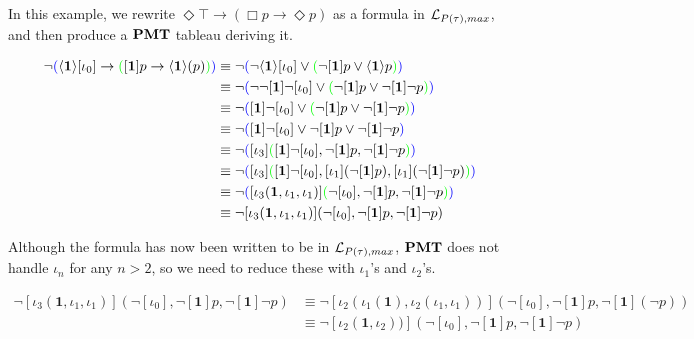 \begin{example}
    In this example, we rewrite $\Diamond\top \to (\Box p \to \Diamond p)$ as a formula in $\mathcal{L}_{P(\tau),max}$, and then produce a $\textbf{PMT}$ tableau deriving it. 

    \begin{align*}
        \neg\textcolor{blue}{(}\langle\textbf{1}\rangle[\iota_0] \rightarrow \textcolor{green}{(}[\textbf{1}] p \rightarrow \langle\textbf{1}\rangle (p)\textcolor{green}{)}\textcolor{blue}{)}
        &\equiv \neg\textcolor{blue}{(}\neg\langle\textbf{1}\rangle[\iota_0] \vee \textcolor{green}{(}\neg[\textbf{1}] p \vee \langle\textbf{1}\rangle p\textcolor{green}{)}\textcolor{blue}{)}\\
        &\equiv \neg\textcolor{blue}{(}\neg\neg[\textbf{1}]\neg[\iota_0] \vee \textcolor{green}{(}\neg[\textbf{1}] p \vee \neg[\textbf{1}]\neg p\textcolor{green}{)}\textcolor{blue}{)}\\
        &\equiv \neg\textcolor{blue}{(}[\textbf{1}]\neg[\iota_0] \vee \textcolor{green}{(}\neg[\textbf{1}] p \vee \neg[\textbf{1}]\neg p\textcolor{green}{)}\textcolor{blue}{)}\\
        &\equiv \neg\textcolor{blue}{(}[\textbf{1}]\neg[\iota_0] \vee\neg[\textbf{1}] p \vee \neg[\textbf{1}]\neg p\textcolor{blue}{)}\\
        &\equiv \neg\textcolor{blue}{(}[\iota_3]\textcolor{green}{(}[\textbf{1}]\neg[\iota_0] ,\neg[\textbf{1}] p , \neg[\textbf{1}]\neg p\textcolor{green}{)}\textcolor{blue}{)}\\
        &\equiv \neg\textcolor{blue}{(}[\iota_3]\textcolor{green}{(}[\textbf{1}]\neg[\iota_0] ,[\iota_1](\neg[\textbf{1}] p) , [\iota_1](\neg[\textbf{1}]\neg p)\textcolor{green}{)}\textcolor{blue}{)}\\
        &\equiv \neg\textcolor{blue}{(}[\iota_3(\textbf{1},\iota_1,\iota_1)]\textcolor{green}{(}\neg[\iota_0],\neg[\textbf{1}] p , \neg[\textbf{1}]\neg p\textcolor{green}{)}\textcolor{blue}{)}\\
        &\equiv \neg[\iota_3(\textbf{1},\iota_1,\iota_1)](\neg[\iota_0],\neg[\textbf{1}] p , \neg[\textbf{1}]\neg p)
    \end{align*}

    \par Although the formula has now been written to be in $\mathcal{L}_{P(\tau),max}$, $\textbf{PMT}$ does not handle $\iota_n$ for any $n>2$, so we need to reduce these with $\iota_1$'s and $\iota_2$'s.

    \begin{align*}
        \neg[\iota_3(\textbf{1},\iota_1,\iota_1)](\neg[\iota_0],\neg[\textbf{1}] p , \neg[\textbf{1}]\neg p)
        &\equiv \neg[\iota_2(\iota_1(\textbf{1}),\iota_2(\iota_1,\iota_1))](\neg[\iota_0],\neg[\textbf{1}] p , \neg[\textbf{1}](\neg p))\\
        &\equiv \neg[\iota_2(\textbf{1},\iota_2))](\neg[\iota_0],\neg[\textbf{1}] p , \neg[\textbf{1}]\neg p)
    \end{align*}


\end{example}
